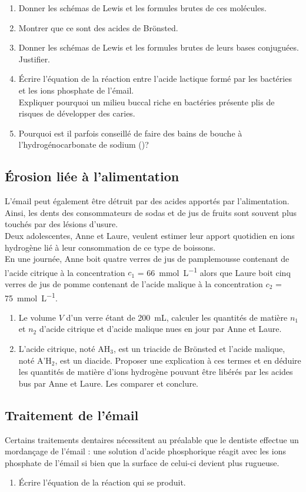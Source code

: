 \documentclass[a4paper,11pt,fleqn]{article}%
\begin{document}
\begin{enumerate}[resume]
	\item Donner les schémas de Lewis et les formules brutes de ces molécules.
	\item Montrer que ce sont des acides de Brönsted.
	\item Donner les schémas de Lewis et les formules brutes de leurs bases conjuguées. Justifier.
	\item Écrire l'équation de la réaction entre l'acide lactique formé par les bactéries et les ions phosphate de l'émail.\\
	Expliquer pourquoi un milieu buccal riche en bactéries présente plis de risques de développer des caries.
	\item Pourquoi est il parfois conseillé de faire des bains de bouche à l'hydrogénocarbonate de sodium ()?
\end{enumerate}

	\subsection{Érosion liée à l'alimentation}
	L'émail peut également être détruit par des acides apportés par l'alimentation. Ainsi, les dents des consommateurs de sodas et de jus de fruits sont souvent plus touchés par des lésions d'usure.\\
	Deux adolescentes, Anne et Laure, veulent estimer leur apport quotidien en ions hydrogène lié à leur consommation de ce type de boissons.\\
	En une journée, Anne boit quatre verres de jus de pamplemousse contenant de l'acide citrique à la concentration $c_1$ = \SI{66}{\milli\mole\per\liter} alors que Laure boit cinq verres de jus de pomme contenant de l'acide malique à la concentration $c_2$ = \SI{75}{\milli\mole\per\liter}.
\begin{enumerate}[resume]
	\item Le volume $V$ d'un verre étant de \SI{200}{mL}, calculer les quantités de matière $n_1$ et $n_2$ d'acide citrique et d'acide malique nues en jour par Anne et Laure.
	\item L'acide citrique, noté AH$_3$, est un triacide de Brönsted et l'acide malique, noté A'H$_2$, est un diacide. Proposer une explication à ces termes et en déduire les quantités de matière d'ions hydrogène pouvant être libérés par les acides bus par Anne et Laure. Les comparer et conclure.
\end{enumerate}

	\subsection{Traitement de l'émail}
Certains traitements dentaires nécessitent au préalable que le dentiste effectue un mordançage de l'émail : une solution d'acide phosphorique  réagit avec les ions phosphate de l'émail si bien que la surface de celui-ci devient plus rugueuse.
\begin{enumerate}[resume]
	\item Écrire l'équation de la réaction qui se produit.
\end{enumerate}
\end{document}
